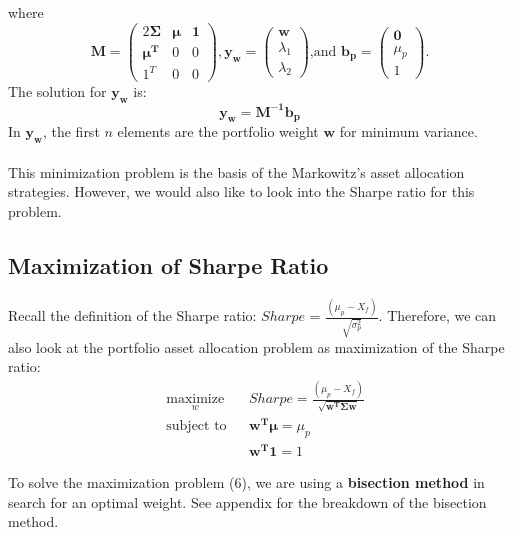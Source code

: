 \documentclass[12pt,titlepage,a4paper]{article}
\begin{document}
where
\begin{equation*}
\mathbf{M} = \begin{pmatrix} 2\mathbf{\Sigma} & \pmb{\mu} & \mathbf{1} \\ \mathbf{\mu^T} & 0 & 0 \\ 1^T & 0 & 0 \end{pmatrix}, 
\mathbf{y_w}=\begin{pmatrix}
\mathbf{w} \\ \lambda_1 \\ \lambda_2
\end{pmatrix} \text{,and }
\mathbf{b_p} = \begin{pmatrix}
\mathbf{0} \\ \mu_p \\ 1
\end{pmatrix}.
\end{equation*}
The solution for $\mathbf{y_w}$ is: 
\begin{equation}
\mathbf{y_w} = \mathbf{M^{-1}b_p}
\end{equation}
In $\mathbf{y_w}$, the first $n$ elements are the portfolio weight $\mathbf{w}$ for minimum variance. \\ \\
This minimization problem is the basis of the Markowitz's asset allocation strategies. However, we would also like to look into the Sharpe ratio for this problem. \\

\subsection{Maximization of Sharpe Ratio}
Recall the definition of the Sharpe ratio: $Sharpe$ = $\frac{(\mu_p - X_f)}{\sqrt{\sigma_p^2}}$. Therefore, we can also look at the portfolio asset allocation problem as maximization of the Sharpe ratio: 
\begin{equation}
\begin{aligned}
& \underset{w}{\text{maximize}}
& & Sharpe = \frac{(\mu_p - X_f)}{\sqrt{\mathbf{w^T\Sigma w}}} \\
& \text{subject to}
& & \mathbf{w^T}\pmb{\mu} = \mu_p \\
&&& \mathbf{w^T1}=1
\end{aligned}
\end{equation}

To solve the maximization problem (6), we are using a \textbf{bisection method} in search for an optimal weight. See appendix for the breakdown of the bisection method.  
\end{document}
